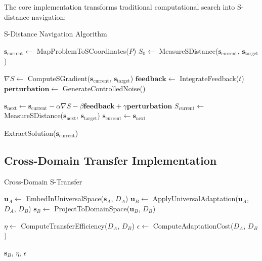 \documentclass[11pt]{article}
\theoremstyle{definition}
\theoremstyle{remark}
\begin{document}
The core implementation transforms traditional computational search into S-distance navigation:

\begin{algorithm}
\caption{S-Distance Navigation Algorithm}
\begin{algorithmic}[1]
    \State $\mathbf{s}_{\text{current}} \gets$ MapProblemToSCoordinates($P$)
    \State $S_0 \gets$ MeasureSDistance($\mathbf{s}_{\text{current}}$, $\mathbf{s}_{\text{target}}$)
    
        \State $\nabla S \gets$ ComputeSGradient($\mathbf{s}_{\text{current}}$, $\mathbf{s}_{\text{target}}$)
        \State $\mathbf{feedback} \gets$ IntegrateFeedback($t$)
        \State $\mathbf{perturbation} \gets$ GenerateControlledNoise()
        
        \State $\mathbf{s}_{\text{next}} \gets \mathbf{s}_{\text{current}} - \alpha \nabla S - \beta \mathbf{feedback} + \gamma \mathbf{perturbation}$
        \State $S_{\text{current}} \gets$ MeasureSDistance($\mathbf{s}_{\text{next}}$, $\mathbf{s}_{\text{target}}$)
        \State $\mathbf{s}_{\text{current}} \gets \mathbf{s}_{\text{next}}$
    \EndWhile
    
    \State \Return ExtractSolution($\mathbf{s}_{\text{current}}$)
\EndProcedure
\end{algorithmic}
\end{algorithm}

\subsection{Cross-Domain Transfer Implementation}

\begin{algorithm}
\caption{Cross-Domain S-Transfer}
\begin{algorithmic}[1]
    \State $\mathbf{u}_A \gets$ EmbedInUniversalSpace($\mathbf{s}_A$, $D_A$)
    \State $\mathbf{u}_B \gets$ ApplyUniversalAdaptation($\mathbf{u}_A$, $D_A$, $D_B$)
    \State $\mathbf{s}_B \gets$ ProjectToDomainSpace($\mathbf{u}_B$, $D_B$)
    
    \State $\eta \gets$ ComputeTransferEfficiency($D_A$, $D_B$)
    \State $\epsilon \gets$ ComputeAdaptationCost($D_A$, $D_B$)
    
    \State \Return $\mathbf{s}_B$, $\eta$, $\epsilon$
\EndProcedure
\end{algorithmic}
\end{algorithm}
\end{document}
